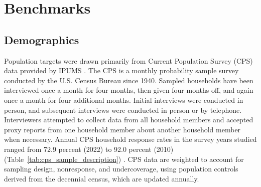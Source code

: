 \documentclass[12pt]{article}
\begin{document}
\section{Benchmarks}
\subsection{Demographics}
Population targets were drawn primarily from  Current Population Survey (CPS) data provided by IPUMS \parencite{flood_ipums_2024}. The CPS is a monthly probability sample survey conducted by the U.S. Census Bureau since 1940. Sampled households have been interviewed once a month for four months, then given four months off, and again once a month for four additional months. Initial interviews were conducted in person, and subsequent interviews were conducted in person or by telephone. Interviewers attempted to collect data from all household members and accepted proxy reports from one household member about another household member when necessary. Annual CPS household response rates in the survey years studied ranged from 72.9 percent (2022) to 92.0 percent (2010) (Table~\ref{tab:cps_sample_description}) \parencite{bls_cps_response_rates}. CPS data are weighted to account for sampling design, nonresponse, and undercoverage, using population controls derived from the decennial census, which are updated annually.   


\end{document}
